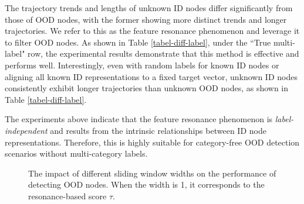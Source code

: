 The trajectory trends and lengths of unknown ID nodes differ significantly from those of OOD nodes, with the former showing more distinct trends and longer trajectories. We refer to this as the feature resonance phenomenon and leverage it to filter OOD nodes. As shown in Table \ref{tabel-diff-label}, under the ``True multi-label" row, the experimental results demonstrate that this method is effective and performs well.
Interestingly, even with random labels for known ID nodes or aligning all known ID representations to a fixed target vector, unknown ID nodes consistently exhibit longer trajectories than unknown OOD nodes, as shown in Table \ref{tabel-diff-label}. 

The experiments above indicate that the feature resonance phenomenon is \textit{label-independent} and results from the intrinsic relationships between ID node representations. Therefore, this is highly suitable for category-free OOD detection scenarios without multi-category labels.









\begin{figure*}[!t]
	\centering
    \caption{The impact of different sliding window widths on the performance of detecting OOD nodes. When the width is 1, it corresponds to the resonance-based score $\tau$.}
    \label{F-slide-window}
\end{figure*}


